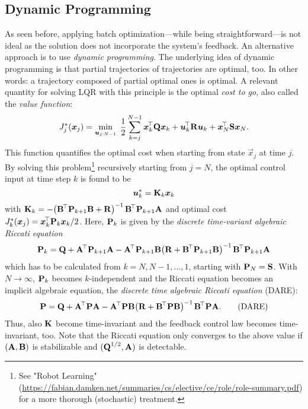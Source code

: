 		\subsection{Dynamic Programming}
			As seen before, applying batch optimization---while being straightforward---is not ideal as the solution does not incorporate the system's feedback. An alternative approach is to use \emph{dynamic programming}. The underlying idea of dynamic programming is that partial trajectories of trajectories are optimal, too. In other words: a trajectory composed of partial optimal ones is optimal. A relevant quantity for solving LQR with this principle is the optimal \emph{cost to go}, also called the \emph{value function}:
			\begin{equation}
				J_j^\ast(\bm{x}_j) = \min_{\bm{u}_{j:N - 1}}\; \frac{1}{2} \sum_{k = j}^{N - 1} \bm{x}_k^{\!\top} \bm{\mathrm{Q}} \bm{x}_k + \bm{u}_k^{\!\top} \bm{\mathrm{R}} \bm{u}_k + \bm{x}_N^{\!\top} \bm{\mathrm{S}} \bm{x}_N.
			\end{equation}
			This function quantifies the optimal cost when starting from state \(\vec{x}_j\) at time \(j\). By solving this problem\footnote{See "Robot Learning" (\url{https://fabian.damken.net/summaries/cs/elective/ce/role/role-summary.pdf}) for a more thorough (stochastic) treatment.} recursively starting from \(j = N\), the optimal control input at time step \(k\) is found to be
			\begin{equation}
				\bm{u}_k^\ast = \bm{\mathrm{K}}_k \bm{x}_k
			\end{equation}
			with \( \bm{\mathrm{K}}_k = -\bigl( \bm{\mathrm{B}}^{\!\top} \bm{\mathrm{P}}_{k + 1} \bm{\mathrm{B}} + \bm{\mathrm{R}} \bigr)^{-1\,} \bm{\mathrm{B}}^{\!\top} \bm{\mathrm{P}}_{k + 1} \bm{\mathrm{A}} \) and optimal cost \( J_k^\ast(\bm{x}_j) = \bm{x}_k^{\!\top} \bm{\mathrm{P}}_k \bm{x}_k / 2 \). Here, \( \bm{\mathrm{P}}_k \) is given by the \emph{discrete time-variant algebraic Riccati equation}
			\begin{equation}
				\bm{\mathrm{P}}_k = \bm{\mathrm{Q}} + \bm{\mathrm{A}}^{\!\top} \bm{\mathrm{P}}_{k + 1} \bm{\mathrm{A}} - \bm{\mathrm{A}}^{\!\top} \bm{\mathrm{P}}_{k + 1} \bm{\mathrm{B}} \bigl( \bm{\mathrm{R}} + \bm{\mathrm{B}}^{\!\top} \bm{\mathrm{P}}_{k + 1} \bm{\mathrm{B}} \bigr)^{-1\,} \bm{\mathrm{B}}^{\!\top} \bm{\mathrm{P}}_{k + 1} \bm{\mathrm{A}}
			\end{equation}
			which has to be calculated from \( k = N, N - 1, \dots, 1 \), starting with \( \bm{\mathrm{P}}_N = \bm{\mathrm{S}} \). With \(N \to \infty\), \(\bm{\mathrm{P}}_k\) becomes \(k\)-independent and the Riccati equation becomes an implicit algebraic equation, the \emph{discrete time algebraic Riccati equation} (DARE):
			\begin{equation}
				\bm{\mathrm{P}} = \bm{\mathrm{Q}} + \bm{\mathrm{A}}^{\!\top} \bm{\mathrm{P}} \bm{\mathrm{A}} - \bm{\mathrm{A}}^{\!\top} \bm{\mathrm{P}} \bm{\mathrm{B}} \bigl( \bm{\mathrm{R}} + \bm{\mathrm{B}}^{\!\top} \bm{\mathrm{P}} \bm{\mathrm{B}} \bigr)^{-1\,} \bm{\mathrm{B}}^{\!\top} \bm{\mathrm{P}} \bm{\mathrm{A}}.  \tag{DARE}
			\end{equation}
			Thus, also \(\bm{\mathrm{K}}\) become time-invariant and the feedback control law becomes time-invariant, too. Note that the Riccati equation only converges to the above value if \( (\bm{\mathrm{A}}, \bm{\mathrm{B}}) \) is stabilizable and \( (\bm{\mathrm{Q}}^{1/2}, \bm{\mathrm{A}}) \) is detectable.

